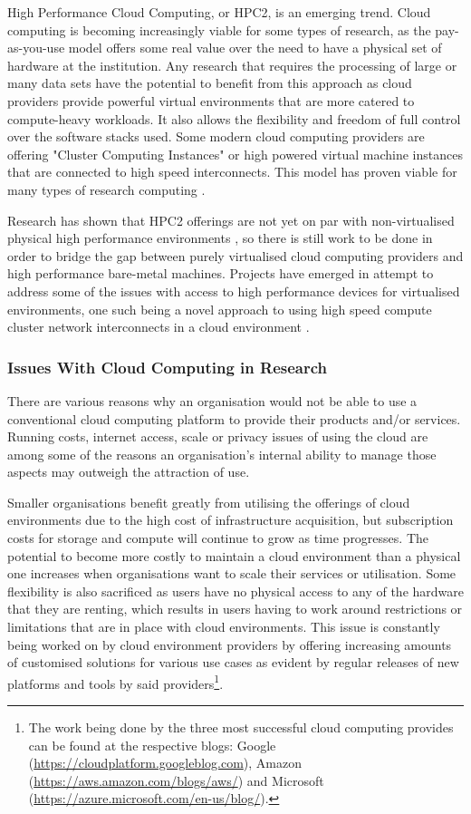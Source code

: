 High Performance Cloud Computing, or HPC2, is an emerging trend. Cloud computing is becoming increasingly viable for some types of research, as the pay-as-you-use model offers some real value over the need to have a physical set of hardware at the institution. Any research that requires the processing of large or many data sets have the potential to benefit from this approach as cloud providers provide powerful virtual environments that are more catered to compute-heavy workloads. It also allows the flexibility and freedom of full control over the software stacks used. Some modern cloud computing providers are offering "Cluster Computing Instances" or high powered virtual machine instances that are connected to high speed interconnects. This model has proven viable for many types of research computing \parencite{hazelhurst2008scientific}.

Research has shown that HPC2 offerings are not yet on par with non-virtualised physical high performance environments \parencite{jackson2010performance}, so there is still work to be done in order to bridge the gap between purely virtualised cloud computing providers and high performance bare-metal machines. Projects have emerged in attempt to address some of the issues with access to high performance devices for virtualised environments, one such being a novel approach to using high speed compute cluster network interconnects in a cloud environment \parencite{mauch2013high}.

\subsubsection{Issues With Cloud Computing in Research}

There are various reasons why an organisation would not be able to use a conventional cloud computing platform to provide their products and/or services. Running costs, internet access, scale or privacy issues of using the cloud are among some of the reasons an organisation's internal ability to manage those aspects may outweigh the attraction of use.

Smaller organisations benefit greatly from utilising the offerings of cloud environments due to the high cost of infrastructure acquisition, but subscription costs for storage and compute will continue to grow as time progresses. The potential to become more costly to maintain a cloud environment than a physical one increases when organisations want to scale their services or utilisation. Some flexibility is also sacrificed as users have no physical access to any of the hardware that they are renting, which results in users having to work around restrictions or limitations that are in place with cloud environments. This issue is constantly being worked on by cloud environment providers by offering increasing amounts of customised solutions for various use cases as evident by regular releases of new platforms and tools by said providers\footnote{The work being done by the three most successful cloud computing provides can be found at the respective blogs: Google (\url{https://cloudplatform.googleblog.com}), Amazon (\url{https://aws.amazon.com/blogs/aws/}) and Microsoft (\url{https://azure.microsoft.com/en-us/blog/}).}.

